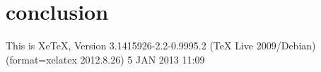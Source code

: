 \documentclass{book}
\begin{document}
\chapter{conclusion}

This is XeTeX, Version\cite{hearst_support_1998,goldberg_genetic_1989,rosenthal_parallel_2000,sugita_replica-exchange_1999,rodinger_distributed_2006} 3.1415926-2.2-0.9995.2 (TeX Live 2009/Debian\cite{fahrenkamp-uppenbrink_theoretical_2008}) (format=xelatex 2012.8.26) 5 JAN 2013 11:09

\backmatter

\pagestyle{bibpage_style}






 
\end{document}
